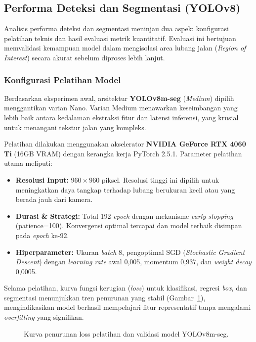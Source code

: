 
\subsection{Performa Deteksi dan Segmentasi (YOLOv8)}
\label{sec:yolo_performance}

Analisis performa deteksi dan segmentasi meninjau dua aspek: konfigurasi pelatihan teknis dan hasil evaluasi metrik kuantitatif. Evaluasi ini bertujuan memvalidasi kemampuan model dalam mengisolasi area lubang jalan (\textit{Region of Interest}) secara akurat sebelum diproses lebih lanjut.

\subsubsection{Konfigurasi Pelatihan Model}

Berdasarkan eksperimen awal, arsitektur \textbf{YOLOv8m-seg} (\textit{Medium}) dipilih menggantikan varian Nano. Varian Medium menawarkan keseimbangan yang lebih baik antara kedalaman ekstraksi fitur dan latensi inferensi, yang krusial untuk menangani tekstur jalan yang kompleks.

Pelatihan dilakukan menggunakan akselerator \textbf{NVIDIA GeForce RTX 4060 Ti} (16GB VRAM) dengan kerangka kerja PyTorch 2.5.1. Parameter pelatihan utama meliputi:
\begin{itemize}
    \item \textbf{Resolusi Input:} $960 \times 960$ piksel. Resolusi tinggi ini dipilih untuk meningkatkan daya tangkap terhadap lubang berukuran kecil atau yang berada jauh dari kamera.
    \item \textbf{Durasi \& Strategi:} Total 192 \textit{epoch} dengan mekanisme \textit{early stopping} (patience=100). Konvergensi optimal tercapai dan model terbaik disimpan pada \textit{epoch} ke-92.
    \item \textbf{Hiperparameter:} Ukuran \textit{batch} 8, pengoptimal SGD (\textit{Stochastic Gradient Descent}) dengan \textit{learning rate} awal 0,005, momentum 0,937, dan \textit{weight decay} 0,0005.
\end{itemize}

Selama pelatihan, kurva fungsi kerugian (\textit{loss}) untuk klasifikasi, regresi \textit{box}, dan segmentasi menunjukkan tren penurunan yang stabil (Gambar~\ref{fig:training_loss}), mengindikasikan model berhasil mempelajari fitur representatif tanpa mengalami \textit{overfitting} yang signifikan.

\begin{figure}[htbp]
  \centering
  \caption{Kurva penurunan loss pelatihan dan validasi model YOLOv8m-seg.}
  \label{fig:training_loss}
\end{figure}

